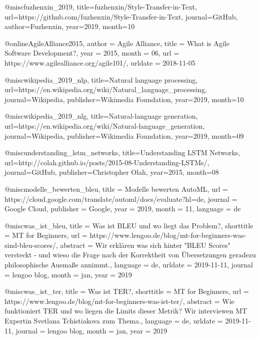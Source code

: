 @misc{fuzhenxin_2019,
    title={fuzhenxin/Style-Transfer-in-Text},
    url={https://github.com/fuzhenxin/Style-Transfer-in-Text},
    journal={GitHub},
    author={Fuzhenxin},
    year={2019},
    month={10}
}

@online{AgileAlliance2015,
	author = {{Agile Alliance}},
	title = {{What is Agile Software Development?}},
	year = {2015},
	month = {06},
	url = {https://www.agilealliance.org/agile101/},
	urldate = {2018-11-05}
}

@misc{wikipedia_2019_nlp,
    title={Natural language processing},
    url={https://en.wikipedia.org/wiki/Natural_language_processing},
    journal={Wikipedia},
    publisher={Wikimedia Foundation},
    year={2019},
    month={10}
}

@misc{wikipedia_2019_nlg,
    title={Natural-language generation},
    url={https://en.wikipedia.org/wiki/Natural-language_generation},
    journal={Wikipedia},
    publisher={Wikimedia Foundation},
    year={2019},
    month={09}
}

@misc{understanding_lstm_networks,
    title={Understanding LSTM Networks},
    url={http://colah.github.io/posts/2015-08-Understanding-LSTMs/},
    journal={GitHub},
    publisher={Christopher Olah},
    year={2015},
    month={08}
}

@misc{modelle_bewerten_bleu,
	title = {Modelle bewerten AutoML},
	url = {https://cloud.google.com/translate/automl/docs/evaluate?hl=de},
    journal = {Google Cloud},
    publisher = {Google},
    year = {2019},
    month = {11},
	language = {de}
}

@misc{was_ist_bleu,
	title = {Was ist BLEU und wo liegt das Problem?},
	shorttitle = {MT for Beginners},
	url = {https://www.lengoo.de/blog/mt-for-beginners-was-sind-bleu-scores/},
	abstract = {Wir erklären was sich hinter "BLEU Scores" versteckt - und wieso die Frage nach der Korrektheit von Übersetzungen geradezu philosophische Ausmaße annimmt.},
	language = {de},
	urldate = {2019-11-11},
	journal = {lengoo blog},
	month = jan,
	year = {2019}
}

@misc{was_ist_ter,
	title = {Was ist TER?},
	shorttitle = {MT for Beginners},
	url = {https://www.lengoo.de/blog/mt-for-beginners-was-ist-ter/},
	abstract = {Wie funktioniert TER und wo liegen die Limits dieser Metrik? Wir interviewen MT Expertin Svetlana Tchistiakova zum Thema.},
	language = {de},
	urldate = {2019-11-11},
	journal = {lengoo blog},
	month = jan,
	year = {2019}
}